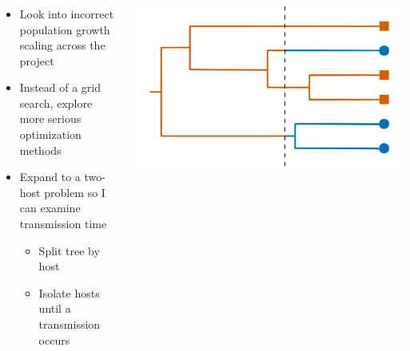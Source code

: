 \documentclass[aspectratio=169]{beamer}
\begin{document}
\begin{frame} \frametitle{\insertsection}
    
    \begin{columns}

        \begin{column}{0.5\textwidth}

            \begin{itemize}
                \item{Look into incorrect population growth scaling across the project}
                \item{Instead of a grid search, explore more serious optimization methods}
                \item{Expand to a two-host problem so I can examine transmission time}
                \begin{itemize}
                    \item{Split tree by host}
                    \item{Isolate hosts until a transmission occurs}
                \end{itemize}
            \end{itemize}
            
        \end{column}

        \begin{column}{0.5\textwidth}

            \centering\includegraphics[width=\textwidth]{images/tree-option1}

        \end{column}

    \end{columns}
    
\end{frame}
\end{document}
